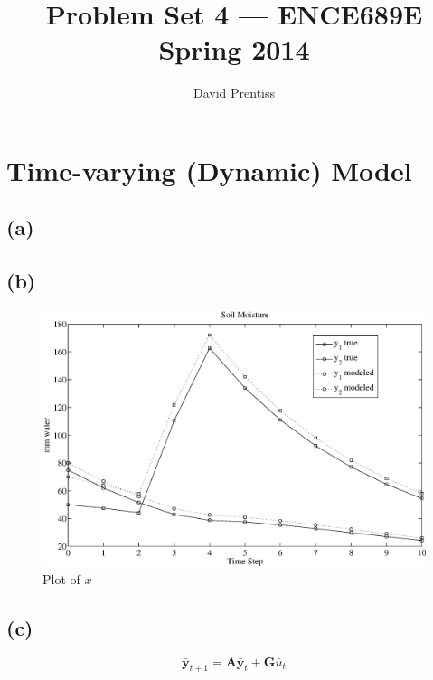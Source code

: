\documentclass[fleqn, letterpaper]{tufte-handout}
\title{Problem Set 4 --- ENCE689E Spring 2014}
\author{David Prentiss}
\begin{document}
\maketitle

\section{Time-varying (Dynamic) Model}

\subsection{(a)}

{\small
\begin{minipage}{\linewidth}
        
\end{minipage}
}

\subsection{(b)}

\begin{figure}
        \includegraphics[width=\textwidth]{ps5figb}
        \caption{Plot of $x$}
        \label{exprnd}
\end{figure}

\subsection{(c)}

\[
\bar{\mathbf{y}}_{t+1} = \mathbf{A}\bar{\mathbf{y}}_t + \mathbf{G}\bar{u}_t
\]
\end{document}
